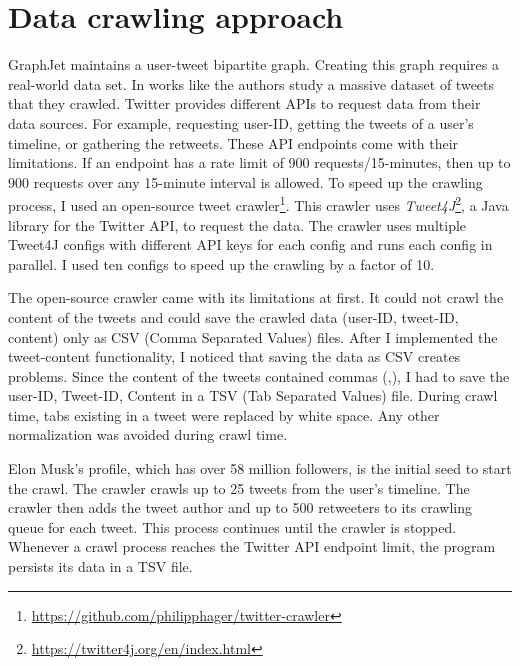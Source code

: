 \section{Data crawling approach}
\label{sec:data-crawling-approach}

GraphJet maintains a user-tweet bipartite graph. Creating this graph requires a real-world data set. In works like \cite{kwakWhatTwitterSocial2010} the authors study a massive dataset of tweets that they crawled. Twitter provides different APIs to request data from their data sources. For example, requesting user-ID, getting the tweets of a user's timeline, or gathering the retweets. These API endpoints come with their limitations. If an endpoint has a rate limit of 900 requests/15-minutes, then up to 900 requests over any 15-minute interval is allowed. To speed up the crawling process, I used an open-source tweet crawler\footnote{\url{https://github.com/philipphager/twitter-crawler}}. This crawler uses \emph{Tweet4J}\footnote{\url{https://twitter4j.org/en/index.html}}, a Java library for the Twitter API, to request the data. The crawler uses multiple Tweet4J configs with different API keys for each config and runs each config in parallel. I used ten configs to speed up the crawling by a factor of 10. 


The open-source crawler came with its limitations at first. It could not crawl the content of the tweets and could save the crawled data (user-ID, tweet-ID, content) only as CSV (Comma Separated Values) files. After I implemented the tweet-content functionality, I noticed that saving the data as CSV creates problems. Since the content of the tweets contained commas (,), I had to save the user-ID, Tweet-ID, Content in a TSV (Tab Separated Values) file. During crawl time, tabs existing in a tweet were replaced by white space. Any other normalization was avoided during crawl time.


Elon Musk's profile, which has over 58 million followers, is the initial seed to start the crawl. The crawler crawls up to 25 tweets from the user's timeline. The crawler then adds the tweet author and up to 500 retweeters to its crawling queue for each tweet. This process continues until the crawler is stopped. Whenever a crawl process reaches the Twitter API endpoint limit, the program persists its data in a TSV file.


